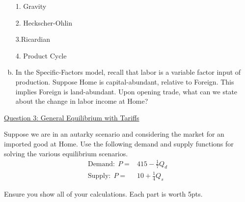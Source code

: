 \documentclass[12pt]{article}
\begin{document}
\begin{enumerate}[a)]
	1. Gravity 
	
	2. Heckscher-Ohlin
	
	3.Ricardian
	
	4. Product Cycle
	
	\bigskip
	
	\item In the Specific-Factors model, recall that labor is a variable factor input of production. 
	Suppose Home is capital-abundant, relative to Foreign. This implies Foreign is land-abundant. 
	Upon opening trade, what can we state about the change in labor income at Home?
	
	\vspace{1.8in}
	
\end{enumerate}

\newpage


\noindent \underline{Question 3: General Equilibrium with Tariffs}

\noindent Suppose we are in an autarky scenario and considering the market for an imported good at Home. 
Use the following demand and supply functions for solving the various equilibrium scenarios.
\begin{align*}
\text{Demand:} \ \  P = & 415 - \frac{1}{7} Q_d\\
\text{Supply:}\ \  P = & 10  + \frac{1}{4} Q_s
\end{align*}

Ensure you show all of your calculations. Each part is worth 5pts. 
\end{document}
